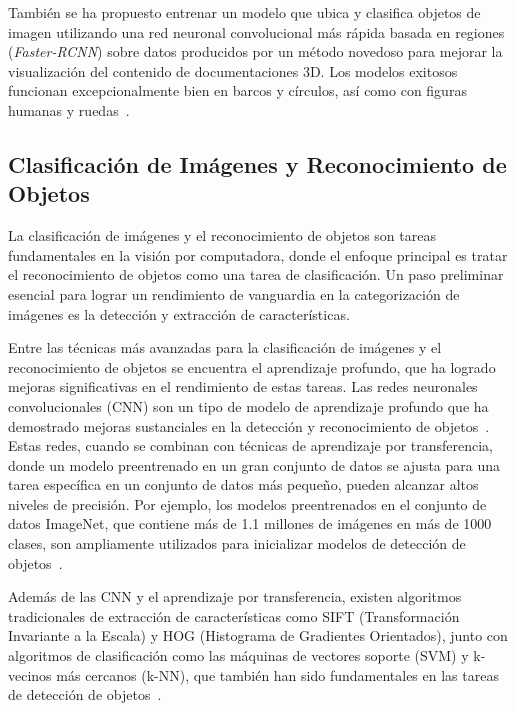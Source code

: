 También se ha propuesto entrenar un modelo que ubica y clasifica objetos de imagen utilizando una red neuronal convolucional más rápida basada en regiones (\textit{Faster-RCNN}) sobre datos producidos por un método novedoso para mejorar la visualización del contenido de documentaciones 3D. Los modelos exitosos funcionan excepcionalmente bien en barcos y círculos, así como con figuras humanas y ruedas~\cite{horn2022}.

\subsection{Clasificación de Imágenes y Reconocimiento de Objetos}

La clasificación de imágenes y el reconocimiento de objetos son tareas fundamentales en la visión por computadora, donde el enfoque principal es tratar el reconocimiento de objetos como una tarea de clasificación. Un paso preliminar esencial para lograr un rendimiento de vanguardia en la categorización de imágenes es la detección y extracción de características.

Entre las técnicas más avanzadas para la clasificación de imágenes y el reconocimiento de objetos se encuentra el aprendizaje profundo, que ha logrado mejoras significativas en el rendimiento de estas tareas. Las redes neuronales convolucionales (CNN) son un tipo de modelo de aprendizaje profundo que ha demostrado mejoras sustanciales en la detección y reconocimiento de objetos~\cite{ionescu2016}. Estas redes, cuando se combinan con técnicas de aprendizaje por transferencia, donde un modelo preentrenado en un gran conjunto de datos se ajusta para una tarea específica en un conjunto de datos más pequeño, pueden alcanzar altos niveles de precisión. Por ejemplo, los modelos preentrenados en el conjunto de datos ImageNet, que contiene más de 1.1 millones de imágenes en más de 1000 clases, son ampliamente utilizados para inicializar modelos de detección de objetos~\cite{bansal2021}.

Además de las CNN y el aprendizaje por transferencia, existen algoritmos tradicionales de extracción de características como SIFT (Transformación Invariante a la Escala) y HOG (Histograma de Gradientes Orientados), junto con algoritmos de clasificación como las máquinas de vectores soporte (SVM) y k-vecinos más cercanos (k-NN), que también han sido fundamentales en las tareas de detección de objetos~\cite{bansal2021}.

